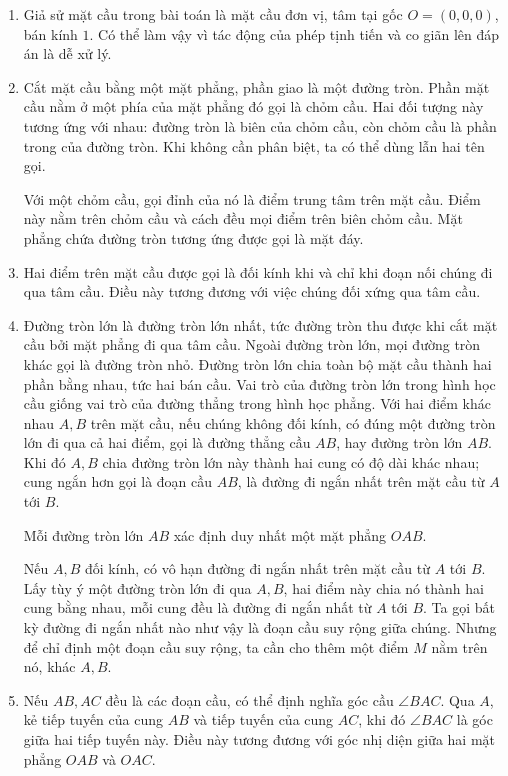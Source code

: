 \documentclass[11pt]{article}
\begin{document}
\begin{enumerate}
  \item Giả sử mặt cầu trong bài toán là mặt cầu đơn vị, tâm tại gốc
  \(O=(0,0,0)\), bán kính \(1\). Có thể làm vậy vì tác động của phép tịnh tiến
  và co giãn lên đáp án là dễ xử lý.

  \item Cắt mặt cầu bằng một mặt phẳng, phần giao là một đường tròn. Phần mặt
  cầu nằm ở một phía của mặt phẳng đó gọi là chỏm cầu. Hai đối tượng này tương
  ứng với nhau: đường tròn là biên của chỏm cầu, còn chỏm cầu là phần trong của
  đường tròn. Khi không cần phân biệt, ta có thể dùng lẫn hai tên gọi.

  Với một chỏm cầu, gọi đỉnh của nó là điểm trung tâm trên mặt cầu. Điểm này
  nằm trên chỏm cầu và cách đều mọi điểm trên biên chỏm cầu. Mặt phẳng chứa
  đường tròn tương ứng được gọi là mặt đáy.

  \item Hai điểm trên mặt cầu được gọi là đối kính khi và chỉ khi đoạn nối chúng
  đi qua tâm cầu. Điều này tương đương với việc chúng đối xứng qua tâm cầu.

  \item Đường tròn lớn là đường tròn lớn nhất, tức đường tròn thu được khi cắt
  mặt cầu bởi mặt phẳng đi qua tâm cầu. Ngoài đường tròn lớn, mọi đường tròn
  khác gọi là đường tròn nhỏ. Đường tròn lớn chia toàn bộ mặt cầu thành hai
  phần bằng nhau, tức hai bán cầu. Vai trò của đường tròn lớn trong hình học
  cầu giống vai trò của đường thẳng trong hình học phẳng. Với hai điểm khác
  nhau \(A,B\) trên mặt cầu, nếu chúng không đối kính, có đúng một đường tròn
  lớn đi qua cả hai điểm, gọi là đường thẳng cầu \(AB\), hay đường tròn lớn
  \(AB\). Khi đó \(A,B\) chia đường tròn lớn này thành hai cung có độ dài khác
  nhau; cung ngắn hơn gọi là đoạn cầu \(AB\), là đường đi ngắn nhất trên mặt
  cầu từ \(A\) tới \(B\).

  Mỗi đường tròn lớn \(AB\) xác định duy nhất một mặt phẳng \(OAB\).

  Nếu \(A,B\) đối kính, có vô hạn đường đi ngắn nhất trên mặt cầu từ \(A\) tới
  \(B\). Lấy tùy ý một đường tròn lớn đi qua \(A,B\), hai điểm này chia nó
  thành hai cung bằng nhau, mỗi cung đều là đường đi ngắn nhất từ \(A\) tới
  \(B\). Ta gọi bất kỳ đường đi ngắn nhất nào như vậy là đoạn cầu suy rộng giữa
  chúng. Nhưng để chỉ định một đoạn cầu suy rộng, ta cần cho thêm một điểm
  \(M\) nằm trên nó, khác \(A,B\).

  \item Nếu \(AB,AC\) đều là các đoạn cầu, có thể định nghĩa góc cầu
  \(\angle BAC\). Qua \(A\), kẻ tiếp tuyến của cung \(AB\) và tiếp tuyến của
  cung \(AC\), khi đó \(\angle BAC\) là góc giữa hai tiếp tuyến này. Điều này
  tương đương với góc nhị diện giữa hai mặt phẳng \(OAB\) và \(OAC\).


\end{enumerate}
\end{document}
